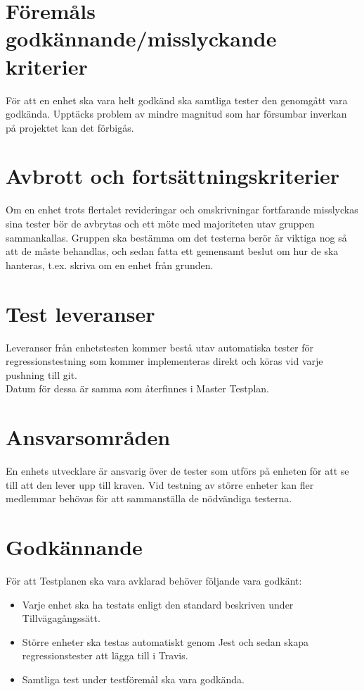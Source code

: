 \section{Föremåls godkännande/misslyckande kriterier}
	För att en enhet ska vara helt godkänd ska samtliga tester den genomgått vara godkända. Upptäcks problem av mindre magnitud som har försumbar inverkan på projektet kan det förbigås.



\section{Avbrott och fortsättningskriterier}
	Om en enhet trots flertalet revideringar och omskrivningar fortfarande misslyckas sina tester bör de avbrytas och ett möte med majoriteten utav gruppen sammankallas.
	Gruppen ska bestämma om det testerna berör är viktiga nog så att de måste behandlas, och sedan fatta ett gemensamt beslut om hur de ska hanteras, t.ex. skriva om en enhet från grunden.


\section{Test leveranser}

Leveranser från enhetstesten kommer bestå utav automatiska tester för regressionstestning som kommer implementeras direkt och köras vid varje pushning till git.\\

Datum för dessa är samma som återfinnes i Master Testplan.



\section{Ansvarsområden}
	En enhets utvecklare är ansvarig över de tester som utförs på enheten för att se till att den lever upp till kraven. Vid testning av större enheter kan fler medlemmar behövas för att sammanställa de nödvändiga testerna.



\section{Godkännande}
	För att Testplanen ska vara avklarad behöver följande vara godkänt:
	\begin{itemize}
	 \item Varje enhet ska ha testats enligt den standard beskriven under Tillvägagångssätt.
	 \item Större enheter ska testas automatiskt genom Jest och sedan skapa regressionstester att lägga till i Travis.
	 \item Samtliga test under testföremål ska vara godkända.
	\end{itemize}




\printbibliography


